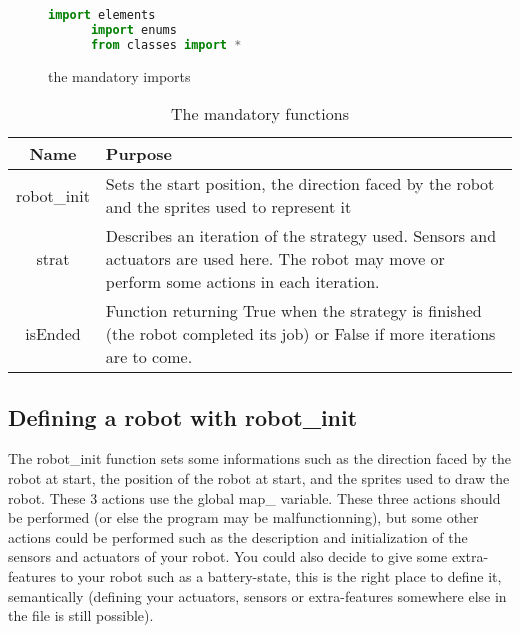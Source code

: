 \documentclass[a4paper,11pt]{article}
\begin{document}
\begin{figure}[h]
  \begin{center}
    \begin{lstlisting}[language=Python]
      import elements
      import enums
      from classes import *
    \end{lstlisting}
    \caption{the mandatory imports}
  \end{center}
\end{figure}

\begin{table}[h]
  \begin{center}
    \begin{tabular}{|c|p{10cm}|}
      \hline
      Name        & Purpose                      \\
      \hline
      robot\_init & Sets the start position, the direction faced by the
      robot and the sprites used to represent it \\
      \hline
      strat       & Describes an iteration of the strategy used. Sensors and
      actuators are used here. The robot may move or perform some
      actions in each iteration.                 \\
      \hline
      isEnded     & Function returning True when the strategy is finished
      (the robot completed its job) or False if more iterations are to
      come.                                      \\ 
      \hline 
    \end{tabular}
    \caption{\label{tab:PyMandatoryFunc} The mandatory functions}
  \end{center}
\end{table}

\subsection{Defining a robot with robot\_init}

The robot\_init function sets some informations such as the direction
faced by the robot at start, the position of the robot at start, and
the sprites used to draw the robot. These 3 actions use the global
map\_ variable. These three actions should be performed (or else the
program may be malfunctionning), but some other actions could be
performed such as the description and initialization of the sensors
and actuators of your robot. You could also decide to give some
extra-features to your robot such as a battery-state, this is the
right place to define it, semantically (defining your actuators,
sensors or extra-features somewhere else in the file is still
possible).
\end{document}
